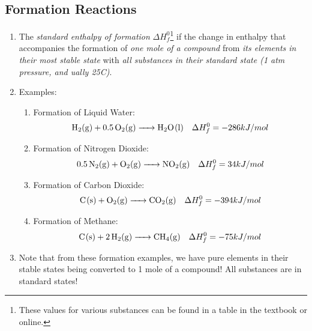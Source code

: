 \documentclass{article}  %
\begin{document}
\subsection*{Formation Reactions}
\begin{enumerate}
    \item The \emph{standard enthalpy of formation} $\Delta H^0_f$\footnote{These values for various substances can be found in a table in the textbook or online.} if the change in enthalpy that accompanies the formation of \emph{one mole of a compound} from \emph{its elements in their most stable state} with \emph{all substances in their standard state (1 atm pressure, and ually 25C)}. 
    \item Examples:
        \begin{enumerate}
            \item Formation of Liquid Water:
                \begin{equation*}
                    \begin{aligned}
                        \ce{H2_(g) + 0.5 O2_(g) -> H2O_(l)} \quad \Delta H^0_f = -286 kJ/mol
                    \end{aligned}
                \end{equation*}
            \item Formation of Nitrogen Dioxide:
                \begin{equation*}
                    \begin{aligned}
                        \ce{0.5 N2_(g) + O2_(g) -> NO2_(g)} \quad \Delta H^0_f = 34 kJ/mol
                    \end{aligned}
                \end{equation*}
            \item Formation of Carbon Dioxide:
                \begin{equation*}
                    \begin{aligned}
                        \ce{C_(s) + O2_(g) -> CO2_(g)} \quad \Delta H^0_f = -394 kJ/mol
                    \end{aligned}
                \end{equation*}
            \item Formation of Methane:
                \begin{equation*}
                    \begin{aligned}
                        \ce{C_(s) + 2 H2_(g) -> CH4_(g)} \quad \Delta H^0_f = -75 kJ/mol
                    \end{aligned}
                \end{equation*}
        \end{enumerate}
    \item Note that from these formation examples, we have pure elements in their stable states being converted to 1 mole of a compound! All substances are in standard states!
\end{enumerate}
\end{document}
